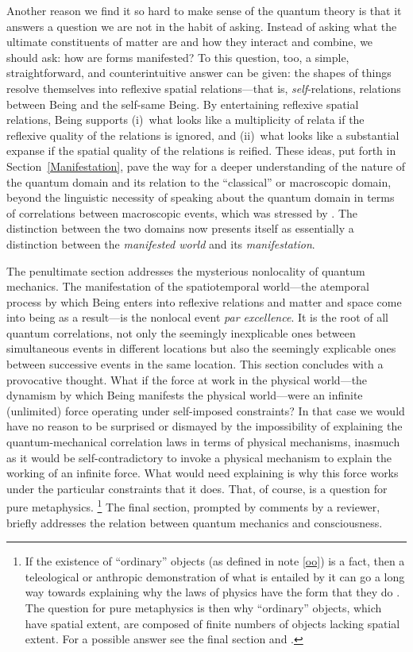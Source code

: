 Another reason we find it so hard to make sense of the quantum theory is that it answers a question we are not in the habit of asking. Instead of asking what the ultimate constituents of matter are and how they interact and combine, we should  ask: how are forms manifested? To this question, too, a simple, straightforward, and counterintuitive answer can be given: the shapes of things resolve themselves into reflexive spatial relations---that is, \emph{self}-relations, relations between Being and the self-same Being. By entertaining reflexive spatial relations, Being supports (i)~what looks like a multiplicity of relata if the reflexive quality of the relations is ignored, and (ii)~what looks like a substantial expanse if the spatial quality of the relations is reified. These ideas, put forth in Section~\ref{Manifestation}, pave the way for a deeper understanding of the nature of the quantum domain and its relation to the ``classical'' or macroscopic domain, beyond the linguistic necessity of speaking about the quantum domain in terms of correlations between macroscopic events, which was stressed by \citet{Bohr1934}. The distinction between the two domains now presents itself as essentially a distinction between the \emph{manifested world} and its \emph{manifestation}. 

The penultimate section addresses the mysterious nonlocality of quantum mechanics. The manifestation of the spatiotemporal world---the atemporal process by which Being enters into reflexive relations and matter and space come into being as a result---is the nonlocal event \emph{par excellence}. It is the root of all quantum correlations, not only the seemingly inexplicable ones between simultaneous events in different locations but also the seemingly explicable ones between successive events in the same location. This section concludes with a provocative thought. What if the force at work in the physical world---the dynamism by which Being manifests the physical world---were an infinite (unlimited) force operating under self-imposed constraints? In that case we would have no reason to be surprised or dismayed by the impossibility of explaining the quantum-mechanical correlation laws in terms of physical mechanisms, inasmuch as it would be self-contradictory to invoke a physical mechanism to explain the working of an infinite force. What would need explaining is why this force works under the particular constraints that it does. That, of course, is a question for pure metaphysics.%
\footnote{If the existence of ``ordinary'' objects (as defined in note \ref{oo}) is a fact, then a teleological or anthropic demonstration of what is entailed by it can go a long way towards explaining why the laws of physics have the form that they do \citep{Mohrhoff2002,Mohrhoff2009b, Mohrhoff2011}. The question for pure metaphysics is then why ``ordinary'' objects, which have spatial extent, are composed of finite numbers of objects lacking spatial extent. For a possible answer see the final section and \citep{Mohrhoff2014a}.}
The final section, prompted by comments by a reviewer, briefly addresses the relation between quantum mechanics and consciousness.

